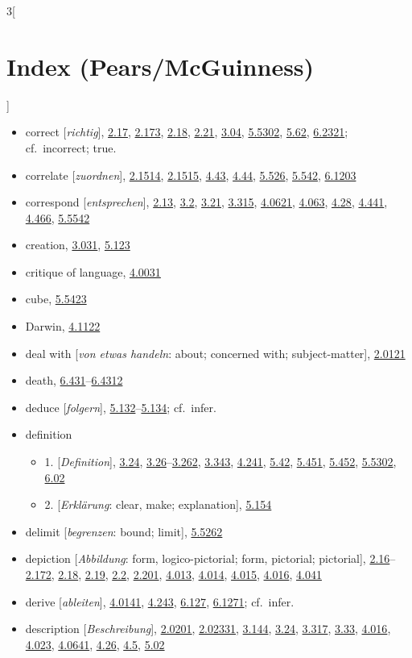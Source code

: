 \documentclass[oneside,openany,12pt]{book}
\newcommand{\indexentry}[1]{\item #1}
\newcommand{\indexsubentry}[1]{\begin{itemize} \item #1 \end{itemize}}
\newcommand{\indexref}[1]{\hyperlink{prop#1}{#1}}
\newcommand{\indexgap}{\bigskip}
\begin{document}
\begin{multicols}{3}[\section*{Index (Pears/McGuinness)}]
\begin{itemize}
\indexentry{correct [\textit{richtig}], \indexref{2.17}, \indexref{2.173}, \indexref{2.18}, \indexref{2.21}, \indexref{3.04}, \indexref{5.5302}, \indexref{5.62}, \indexref{6.2321}; cf.\ incorrect; true.}

\indexentry{correlate [\textit{zuordnen}], \indexref{2.1514}, \indexref{2.1515}, \indexref{4.43}, \indexref{4.44}, \indexref{5.526}, \indexref{5.542}, \indexref{6.1203}}

\indexentry{correspond [\textit{entsprechen}], \indexref{2.13}, \indexref{3.2}, \indexref{3.21}, \indexref{3.315}, \indexref{4.0621}, \indexref{4.063}, \indexref{4.28}, \indexref{4.441}, \indexref{4.466}, \indexref{5.5542}}

\indexentry{creation, \indexref{3.031}, \indexref{5.123}}

\indexentry{critique of language, \indexref{4.0031}}

\indexentry{cube, \indexref{5.5423}}

\indexgap

\indexentry{Darwin, \indexref{4.1122}}

\indexentry{deal with [\textit{von etwas handeln}: about; concerned with; subject-matter], \indexref{2.0121}}

\indexentry{death, \indexref{6.431}--\indexref{6.4312}}

\indexentry{deduce [\textit{folgern}], \indexref{5.132}--\indexref{5.134}; cf.\ infer.}

\indexentry{definition}

   \indexsubentry{1. [\textit{Definition}], \indexref{3.24}, \indexref{3.26}--\indexref{3.262}, \indexref{3.343}, \indexref{4.241}, \indexref{5.42}, \indexref{5.451}, \indexref{5.452}, \indexref{5.5302}, \indexref{6.02}}

   \indexsubentry{2. [\textit{Erkl{\"a}rung}: clear, make; explanation], \indexref{5.154}}

\indexentry{delimit [\textit{begrenzen}: bound; limit], \indexref{5.5262}}

\indexentry{depiction [\textit{Abbildung}: form, logico-pictorial; form, pictorial; pictorial], \indexref{2.16}--\indexref{2.172}, \indexref{2.18}, \indexref{2.19}, \indexref{2.2}, \indexref{2.201}, \indexref{4.013}, \indexref{4.014}, \indexref{4.015}, \indexref{4.016}, \indexref{4.041}}

\indexentry{derive [\textit{ableiten}], \indexref{4.0141}, \indexref{4.243}, \indexref{6.127}, \indexref{6.1271}; cf.\ infer.}

\indexentry{description [\textit{Beschreibung}], \indexref{2.0201}, \indexref{2.02331}, \indexref{3.144}, \indexref{3.24}, \indexref{3.317}, \indexref{3.33}, \indexref{4.016}, \indexref{4.023}, \indexref{4.0641}, \indexref{4.26}, \indexref{4.5}, \indexref{5.02}}


\end{itemize}
\end{multicols}
\end{document}
